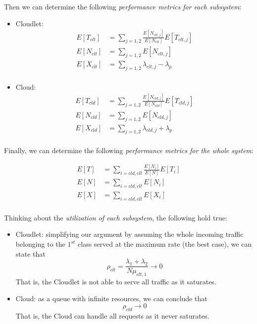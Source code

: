 Then we can determine the following \textit{performance metrics for each subsystem}:

\begin{itemize}
	\item Cloudlet:
	\begin{equation} 
	\begin{split}
	E[T_{clt}] &= \sum_{j=1,2}\frac{E[N_{clt,j}]}{E[N_{clt}]}E[T_{clt,j}] \\
	E[N_{clt}] &= \sum_{j=1,2}E[N_{clt,j}] \\
	E[X_{clt}] &= \sum_{j=1,2}\lambda_{clt,j}-\lambda_{p} \\
	\end{split}
	\end{equation}
	
	\item Cloud:
	\begin{equation} 
	\begin{split}
	E[T_{cld}] &= \sum_{j=1,2}\frac{E[N_{cld,j}]}{E[N_{cld}]}E[T_{cld,j}] \\
	E[N_{cld}] &= \sum_{j=1,2}E[N_{cld,j}] \\
	E[X_{cld}] &= \sum_{j=1,2}\lambda_{cld,j}+\lambda_{p} \\
	\end{split}
	\end{equation}
\end{itemize}

Finally, we can determine the following \textit{performance metrics for the whole system}:

\begin{equation} 
\begin{split}
E[T] &= \sum_{i=cld,clt}\frac{E[N_{i}]}{E[N]}E[T_{i}] \\
E[N] &= \sum_{i=cld,clt}E[N_{i}] \\
E[X] &= \sum_{i=cld,clt}E[X_{i}] \\
\end{split}
\end{equation}

Thinking about the \textit{utilization of each subsystem}, the following hold true:

\begin{itemize}
	\item Cloudlet: simplifying our argument by assuming the whole incoming traffic belonging to the $1^{st}$ class served at the maximum rate (the best case), we can state that
	\begin{equation} 
	\rho_{clt} = \frac{\lambda_{1}+\lambda_{2}}{N\mu_{clt,1}}\rightarrow 0
	\end{equation}
	That is, the Cloudlet is not able to serve all traffic as it saturates.
	
	\item Cloud: as a queue with infinite resources, we can conclude that
	\begin{equation}
	\rho_{cld} \rightarrow 0
	\end{equation}
	That is, the Cloud can handle all requests as it never saturates.
\end{itemize}


